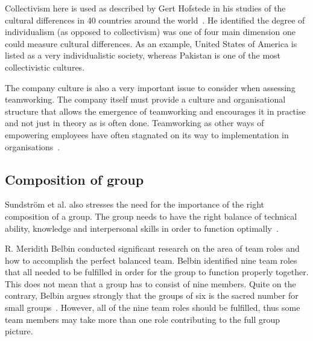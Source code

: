 \documentclass[a4paper,12pt,titlepage]{article}
\begin{document}
  Collectivism here is used as described
  by Gert Hofstede in his studies of the cultural
  differences in 40 countries around the world~\cite[148-177]{gh}.
  He identified the degree of individualism (as opposed to collectivism)
  was one of four main dimension one could measure cultural differences.
  As an example, United States of America is listed as a very
  individualistic society, whereas Pakistan is one of the most
  collectivistic cultures.

  The company culture is also a very important issue to consider
  when assessing teamworking. The company itself must provide
  a culture and organisational structure that allows the
  emergence of teamworking and encourages it in practise and
  not just in theory as is often done. Teamworking as other
  ways of empowering employees have often stagnated on its way
  to implementation in organisations~\cite[101]{rw}.
  
  \subsection{Composition of group}
  Sundstr\"{o}m et al. also stresses the need for the importance
  of the right composition of a group. The group needs to have
  the right balance of technical ability, knowledge and interpersonal
  skills in order to function optimally~\cite[69]{rb}.

  R. Meridith Belbin conducted significant research on
  the area of team roles and how
  to accomplish the perfect balanced team. Belbin identified nine
  team roles that all needed to be fulfilled in order for the group
  to function properly together. This does not mean that a group
  has to consist of nine members. Quite on the contrary, Belbin
  argues strongly that the groups of six is the sacred number for
  small groups~\cite[115-7]{rmb}. However, all of the nine team roles
  should be fulfilled, thus some team members may take more than
  one role contributing to the full group picture.
\end{document}
